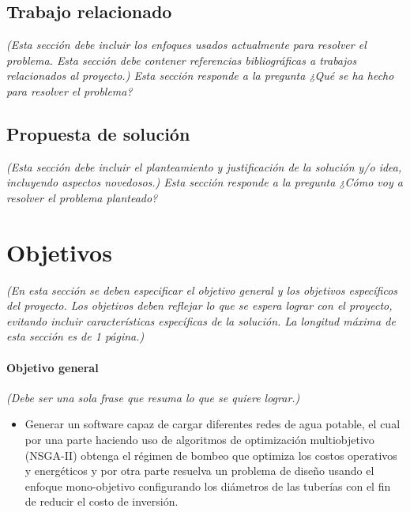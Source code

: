 \documentclass[11pt,letterpaper]{article}
\begin{document}
\subsection{Trabajo relacionado} 
\emph{(Esta sección debe incluir los enfoques usados actualmente para resolver el problema. Esta sección debe contener referencias bibliográficas a trabajos relacionados al proyecto.) Esta sección responde a la pregunta ¿Qué se ha hecho para resolver el problema?}

\subsection{Propuesta de solución}
\emph{(Esta sección debe incluir el planteamiento y justificación de la solución y/o idea, incluyendo aspectos novedosos.) Esta sección responde a la pregunta ¿Cómo voy a resolver el problema planteado?}


\section{Objetivos}
\emph{(En esta sección se deben especificar el objetivo general y los objetivos específicos del proyecto. Los objetivos deben reflejar lo que se espera lograr con el proyecto, evitando incluir características específicas de la solución. La longitud máxima de esta sección es de 1 página.)}

\paragraph{Objetivo general}
\emph{(Debe ser una sola frase que resuma lo que se quiere lograr.)} 
\begin{itemize}
\item Generar un software capaz de cargar diferentes redes de agua potable, el cual por una parte haciendo uso de algoritmos de optimización multiobjetivo (NSGA-II) obtenga el régimen de bombeo que optimiza los costos operativos y energéticos y por otra parte resuelva un problema de diseño usando el enfoque mono-objetivo configurando los diámetros de las tuberías con el fin de reducir el costo de inversión.
\end{itemize}
\end{document}
